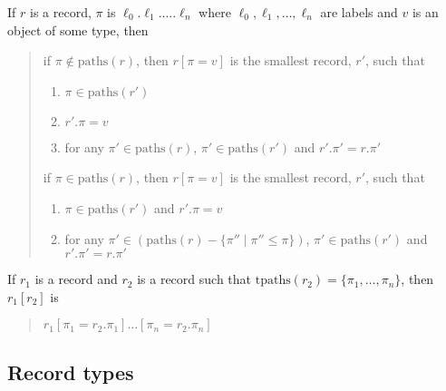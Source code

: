 If $r$ is a record, $\pi$ is $\ell_0.\ell_1.\ldots.\ell_n$ where
    $\ell_0,\ell_1,\ldots,\ell_n$ are labels and $v$ is an object of some
    type, then
    \begin{quote}
      if $\pi\not\in\mathrm{paths}(r)$, then $r[\pi=v]$ is the
      smallest record, $r'$, such that
      \begin{enumerate} 
        
      \item $\pi\in\mathrm{paths}(r')$ 
        
      \item $r'.\pi=v$
        
      \item for any $\pi'\in\mathrm{paths}(r)$,
        $\pi'\in\mathrm{paths}(r')$ and $r'.\pi'=r.\pi'$
        
      \end{enumerate} 

      if $\pi\in\mathrm{paths}(r)$, then $r[\pi=v]$ is the
      smallest record, $r'$, such that
      \begin{enumerate} 
        
      \item  $\pi\in\mathrm{paths}(r')$ and $r'.\pi=v$
        
      \item  for any $\pi'\in(\mathrm{paths}(r)-\{\pi''\mid
        \pi''\leq\pi\})$, $\pi'\in\mathrm{paths}(r')$ and $r'.\pi'=r.\pi'$
        
      \end{enumerate}
    \end{quote}

    If $r_1$ is a record and $r_2$ is a record such that
    $\mathrm{tpaths}(r_2)=\{\pi_1,\ldots,\pi_n\}$, then $r_1[r_2]$ is
    \begin{quote}
$r_1[\pi_1=r_2.\pi_1]\ldots[\pi_n=r_2.\pi_n]$
\end{quote}

\subsection{Record types}
\label{app:rectypes}



